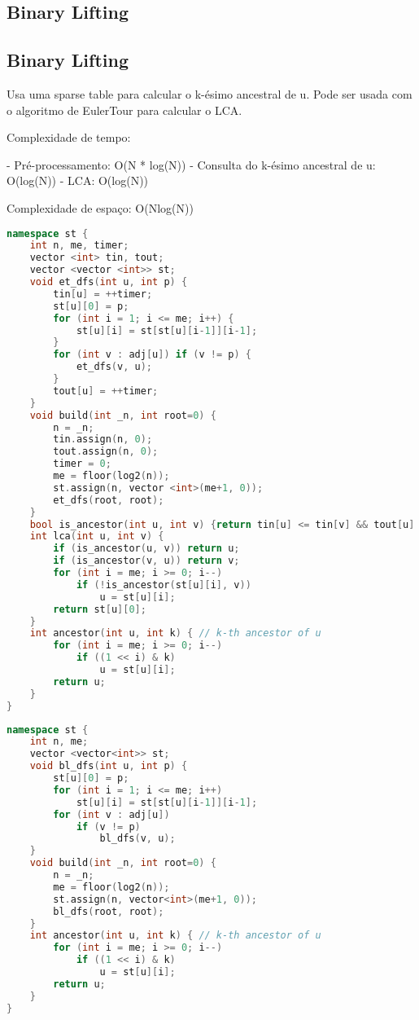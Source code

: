 \documentclass[11pt, a4paper, twoside]{article}
\begin{document}
\subsection{Binary Lifting}

\subsection{Binary Lifting}


Usa uma sparse table para calcular o k-ésimo ancestral de u.
Pode ser usada com o algoritmo de EulerTour para calcular o LCA.

Complexidade de tempo:

- Pré-processamento: O(N * log(N))
- Consulta do k-ésimo ancestral de u: O(log(N))
- LCA: O(log(N))

Complexidade de espaço: O(Nlog(N))

\begin{lstlisting}[language=C++]
namespace st {
    int n, me, timer;
    vector <int> tin, tout;
    vector <vector <int>> st;
    void et_dfs(int u, int p) {
        tin[u] = ++timer;
        st[u][0] = p;
        for (int i = 1; i <= me; i++) {
            st[u][i] = st[st[u][i-1]][i-1];
        }
        for (int v : adj[u]) if (v != p) {
            et_dfs(v, u);
        }
        tout[u] = ++timer;
    }
    void build(int _n, int root=0) {
        n = _n;
        tin.assign(n, 0);
        tout.assign(n, 0);
        timer = 0;
        me = floor(log2(n));
        st.assign(n, vector <int>(me+1, 0));
        et_dfs(root, root);
    }
    bool is_ancestor(int u, int v) {return tin[u] <= tin[v] && tout[u] >= tout[v];}
    int lca(int u, int v) {
        if (is_ancestor(u, v)) return u;
        if (is_ancestor(v, u)) return v;
        for (int i = me; i >= 0; i--)
            if (!is_ancestor(st[u][i], v))
                u = st[u][i];
        return st[u][0];
    }
    int ancestor(int u, int k) { // k-th ancestor of u 
        for (int i = me; i >= 0; i--)
            if ((1 << i) & k)
                u = st[u][i];
        return u;
    }
}
\end{lstlisting}

\begin{lstlisting}[language=C++]
namespace st {
    int n, me;
    vector <vector<int>> st;
    void bl_dfs(int u, int p) {
        st[u][0] = p;
        for (int i = 1; i <= me; i++)
            st[u][i] = st[st[u][i-1]][i-1];
        for (int v : adj[u]) 
            if (v != p)
                bl_dfs(v, u);
    }
    void build(int _n, int root=0) {
        n = _n;
        me = floor(log2(n));
        st.assign(n, vector<int>(me+1, 0));
        bl_dfs(root, root);
    }
    int ancestor(int u, int k) { // k-th ancestor of u 
        for (int i = me; i >= 0; i--)
            if ((1 << i) & k)
                u = st[u][i];
        return u;
    }
}
\end{lstlisting}
\end{document}
